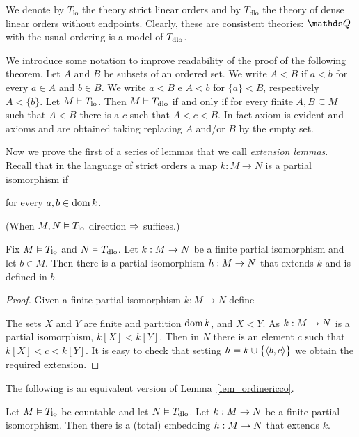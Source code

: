\documentclass[creche.tex]{subfiles}
\begin{document}
We denote by \emph{$T_{\textrm{lo}}$} the theory strict linear orders and by \emph{$T_{\textrm{dlo}}$} the theory of dense linear orders without endpoints. Clearly, these are consistent theories: $\QQ$ with the usual ordering is a model of $T_{\rm dlo}$.

We introduce some notation to improve readability of the proof of the following theorem. Let $A$ and $B$ be subsets of an ordered set. We write $A<B$ if $a<b$ for every $a\in A$ and $b\in B$. We write $a<B$ e $A<b$ for $\{a\}<B$, respectively $A<\{b\}$. Let $M\models T_{\rm lo}$. Then $M\models T_{\rm dlo}$ if and only if for every finite $A, B\subseteq M$ such that $A<B$ there is a $c$ such that  $A<c<B$.  In fact axiom  is evident and axioms  and  are obtained taking replacing $A$ and/or $B$ by the empty set.

Now we prove the first of a series of lemmas that we call \emph{extension lemmas}. Recall that in the language of strict orders a map $k:M\to N$ is a partial isomorphism if

\hfill for every $a,b\in\dom k$.

(When $M,N\models T_{\rm lo}$ direction $\IMP$ suffices.)


\begin{lemma}\label{lem_ordinericco}
Fix $M\models T_{\rm lo}$ and $N\models T_{\rm dlo}$. Let $k:M\imp N$ be a finite partial isomorphism and let $b\in M$. Then there is a partial isomorphism $h:M\imp N$ that extends $k$ and is defined in $b$.
\end{lemma}

\begin{proof}
Given a finite partial isomorphism $k:M\to N$ define



The sets $X$ and $Y$ are finite and partition $\dom k$, and  $X<Y$. As $k:M\imp N$ is a partial isomorphism, $k[X]<k[Y]$. Then in $N$ there is an element $c$ such that $k[X]<c<k[Y]$. It is easy to check that setting $h=k\cup\big\{\<b,c\>\big\}$ we obtain the required extension.
\end{proof}

The following is an equivalent version of Lemma~\ref{lem_ordinericco}.

\begin{corollary}\label{coroll_ordinericco}
Let $M\models T_{\rm lo}$ be countable and let $N\models T_{\rm dlo}$. Let $k:M\imp N$ be a finite partial isomorphism. Then there is a (total) embedding $h:M\imp N$ that extends $k$.
\end{corollary}
\end{document}
